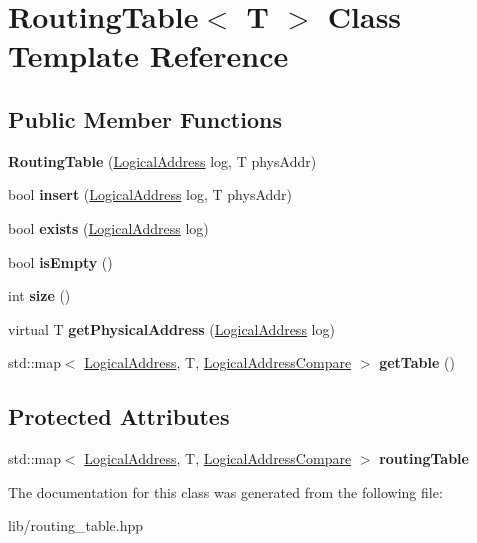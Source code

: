 \hypertarget{classRoutingTable}{}\section{Routing\+Table$<$ T $>$ Class Template Reference}
\label{classRoutingTable}
\subsection*{Public Member Functions}
\begin{DoxyCompactItemize}
\item 
\mbox{\label{classRoutingTable_ac7478945fabd9d107e8ecdafdb094602}} 
{\bfseries Routing\+Table} (\hyperlink{structLogicalAddress}{Logical\+Address} log, T phys\+Addr)
\item 
\mbox{\label{classRoutingTable_a6732eb52fc45bc6ae93047b87f4726fe}} 
bool {\bfseries insert} (\hyperlink{structLogicalAddress}{Logical\+Address} log, T phys\+Addr)
\item 
\mbox{\label{classRoutingTable_a82506122881b23b6c508ee3c5eceea2d}} 
bool {\bfseries exists} (\hyperlink{structLogicalAddress}{Logical\+Address} log)
\item 
\mbox{\label{classRoutingTable_acdeee42f79a685483bc6e8ba5014de42}} 
bool {\bfseries is\+Empty} ()
\item 
\mbox{\label{classRoutingTable_a171f5d7e7f84b4415eae14f2161fc2e9}} 
int {\bfseries size} ()
\item 
\mbox{\label{classRoutingTable_ae55b8c9ac65251bdc462a81076f7a500}} 
virtual T {\bfseries get\+Physical\+Address} (\hyperlink{structLogicalAddress}{Logical\+Address} log)
\item 
\mbox{\label{classRoutingTable_ad3786a2950ae5efb9cfe87449cc895e1}} 
std\+::map$<$ \hyperlink{structLogicalAddress}{Logical\+Address}, T, \hyperlink{structLogicalAddressCompare}{Logical\+Address\+Compare} $>$ {\bfseries get\+Table} ()
\end{DoxyCompactItemize}
\subsection*{Protected Attributes}
\begin{DoxyCompactItemize}
\item 
\mbox{\label{classRoutingTable_ad348863258a92ca89d4150ca6f20aabb}} 
std\+::map$<$ \hyperlink{structLogicalAddress}{Logical\+Address}, T, \hyperlink{structLogicalAddressCompare}{Logical\+Address\+Compare} $>$ {\bfseries routing\+Table}
\end{DoxyCompactItemize}


The documentation for this class was generated from the following file\+:\begin{DoxyCompactItemize}
\item 
lib/routing\+\_\+table.\+hpp\end{DoxyCompactItemize}
